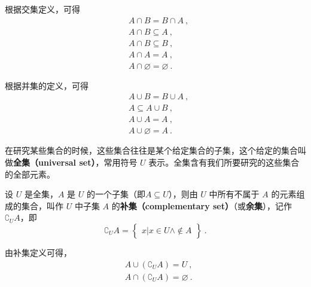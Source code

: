 根据交集定义，可得
\begin{equation}
\begin{aligned}
&A\cap B = B\cap A~, \\ 
&A\cap B \subseteq A ~,\\
&A\cap B \subseteq B~, \\
&A\cap A = A ~,\\
&A\cap \varnothing = \varnothing~.
\end{aligned}
\end{equation}

根据并集的定义，可得
\begin{equation}
\begin{aligned}
&A\cup B = B\cup A~, \\
&A\subseteq A\cup B ~,\\
&A\cup A = A ~,\\
&A\cup \varnothing = A~.
\end{aligned}
\end{equation}

在研究某些集合的时候，这些集合往往是某个给定集合的子集，这个给定的集合叫做\textbf{全集（universal set）}，常用符号 $U$ 表示。全集含有我们所要研究的这些集合的全部元素。

设 $U$ 是全集，$A$ 是 $U$ 的一个子集（即$A\subseteq U$），则由 $U$ 中所有不属于 $A$ 的元素组成的集合，叫作 $U$ 中子集 $A$ 的\textbf{补集（complementary set）}（或\textbf{余集}），记作$\complement_UA$，即
\begin{equation}
\complement_UA = \begin{Bmatrix}x|x\in U \wedge \notin A\end{Bmatrix}~.
\end{equation}

由补集定义可得，
\begin{equation}
\begin{aligned}
&A\cup (\complement_UA) = U~, \\
&A\cap (\complement_UA) = \varnothing~.
\end{aligned}
\end{equation}
